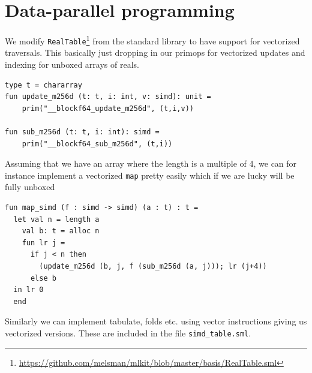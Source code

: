 \documentclass{article}
\begin{document}
\section{Data-parallel programming}

We modify \texttt{RealTable}\footnote{\url{https://github.com/melsman/mlkit/blob/master/basis/RealTable.sml}} from the standard library to have support for vectorized traversals. This basically just dropping in our primops for vectorized updates and indexing for unboxed arrays of reals.
\begin{verbatim}
type t = chararray
fun update_m256d (t: t, i: int, v: simd): unit =
    prim("__blockf64_update_m256d", (t,i,v))

fun sub_m256d (t: t, i: int): simd =
    prim("__blockf64_sub_m256d", (t,i))
\end{verbatim}

Assuming that we have an array where the length is a multiple of 4, we can for instance implement a vectorized \texttt{map} pretty easily which if we are lucky will be fully unboxed
\begin{verbatim}
fun map_simd (f : simd -> simd) (a : t) : t =
  let val n = length a
    val b: t = alloc n
	fun lr j =
      if j < n then
        (update_m256d (b, j, f (sub_m256d (a, j))); lr (j+4))
      else b
  in lr 0
  end
\end{verbatim}
Similarly we can implement tabulate, folds etc. using vector instructions giving us vectorized versions. These are included in the file \verb!simd_table.sml!.
\end{document}
